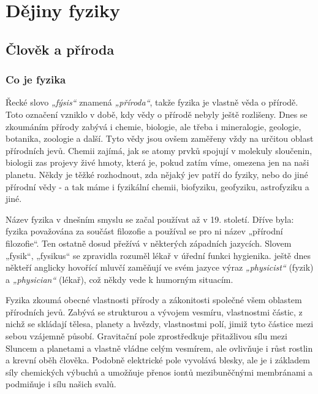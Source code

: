 \setchaptertoc
\chapter{Dějiny fyziky}\label{fyz:IchapII} 
  \section{Člověk a příroda}\label{fyz:IchapIIsecI}
    \subsection{Co je fyzika}\label{fyz:IchapIIsecIssecI}
      Řecké slovo \emph{„fýsis“} znamená \emph{„příroda“}, takže fyzika je vlastně věda o přírodě.
      Toto označení vzniklo v době, kdy vědy o přírodě nebyly ještě rozlišeny. Dnes se zkoumáním
      přírody zabývá i chemie, biologie, ale třeba i mineralogie, geologie, botanika, zoologie a
      další. Tyto vědy jsou ovšem zaměřeny vždy na určitou oblast přírodních jevů. Chemii zajímá,
      jak se atomy prvků spojují v molekuly sloučenin, biologii zas projevy živé hmoty, která je,
      pokud zatím víme, omezena jen na naši planetu. Někdy je těžké rozhodnout, zda nějaký jev patří
      do fyziky, nebo do jiné přírodní vědy - a tak máme i fyzikální chemii, biofyziku, geofyziku,
      astrofyziku a jiné. 
      
      Název fyzika v dnešním smyslu se začal používat až v 19. století. Dříve byla: fyzika
      považována za součást filozofie a používal se pro ni název „přírodní filozofie“. Ten ostatně
      dosud přežívá v některých západních jazycích. Slovem „fysik“, „fysikus“ se zpravidla rozuměl
      lékař v úřední funkci hygienika. ještě dnes někteří anglicky hovořící mluvčí zaměňují ve svém
      jazyce výraz \emph{„physicist“} (fyzik) a \emph{„physician“} (lékař), což někdy vede k
      humorným situacím. 
      
      Fyzika zkoumá obecné vlastnosti přírody a zákonitosti společné všem oblastem přírodních jevů.
      Zabývá se strukturou a vývojem vesmíru, vlastnostmi částic, z nichž se skládají tělesa,
      planety a hvězdy, vlastnostmi polí, jimiž tyto částice mezi sebou vzájemně působí. Gravitační
      pole zprostředkuje přitažlivou sílu mezi Sluncem a planetami a vlastně vládne celým vesmírem,
      ale ovlivňuje i růst rostlin a krevní oběh člověka. Podobně elektrické pole vyvolává blesky,
      ale je i základem síly chemických výbuchů a umožňuje přenos iontů mezibuněčnými membránami a
      podmiňuje i sílu našich svalů. 

